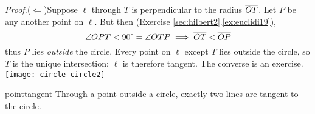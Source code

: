 \begin{tcolorbox}[proofstyle, lower separated=false, sidebyside, sidebyside align=top seam, sidebyside gap=0pt, righthand width=0.33\linewidth]
	\emph{Proof.}\lstsp ($\Leftarrow$)\lstsp Suppose $\ell$ through $T$ is perpendicular to the radius $\cl{OT}$.\smallbreak
	Let $P$ be any another point on $\ell$. But then (Exercise \ref*{sec:hilbert2}.\ref{ex:euclidi19}),
	\[
		\angle OPT<\ang{90}=\angle OTP\implies \cl{OT}<\cl{OP}
	\]
	thus $P$ lies \emph{outside} the circle. Every point on $\ell$ except $T$ lies outside the circle, so $T$ is the unique intersection: $\ell$ is therefore tangent.\medbreak
	The converse is an exercise.
	\tcblower
	\flushright
	\texttt{[image: circle-circle2]}\\[-8pt]
	\hfill\qedsymbol
\end{tcolorbox}

\begin{thm}{}{pointtangent}
	Through a point outside a circle, exactly two lines are tangent to the circle.
\end{thm}

